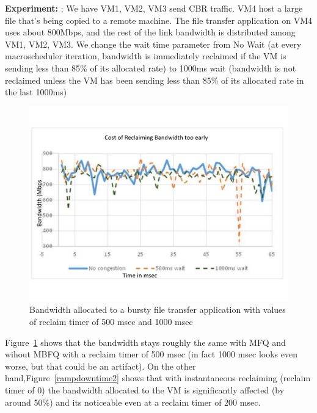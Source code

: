 {\bf Experiment:} : We have VM1, VM2, VM3 send CBR traffic. VM4 host a large
file that's being copied to a remote machine.  The file transfer application on
VM4 uses about 800Mbps, and the rest of the link bandwidth is distributed among
VM1, VM2, VM3.  We change the wait time parameter from No Wait (at every
macroscheduler iteration, bandwidth is immediately reclaimed if the VM is
sending less than 85\% of its allocated rate) to 1000ms wait (bandwidth is not
reclaimed unless the VM has been sending less than 85\% of its allocated rate in
the last 1000ms)
 
\begin{figure}[h]
\centering
\includegraphics[width=\columnwidth,trim=60pt 20mm 0pt 8mm]{figures/rampdowntime1}
\caption{Bandwidth allocated to a bursty file transfer application with values of reclaim timer of 500 msec and 1000 msec}
\label{rampdowntime1}
\vspace{-3mm}
\end{figure}

Figure~\ref{rampdowntime1} shows that the bandwidth stays roughly the same with
MFQ and wihout MBFQ with a reclaim timer of 500 msec (in fact 1000 msec looks
even worse, but that could be an artifact).   On the other
hand,Figure~\ref{rampdowntime2} shows that with instantaneous reclaiming
(reclaim timer of 0) the bandwidth allocated to the VM is significantly affected
(by around 50\%) and its noticeable even at a reclaim timer of 200 msec.

